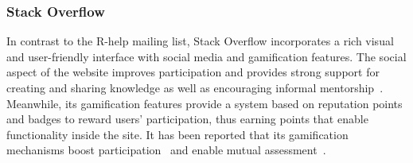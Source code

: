 \subsubsection{Stack Overflow}
\label{subsec:Rtag}

    In contrast to the R-help mailing list, Stack Overflow incorporates a rich visual and user-friendly interface with social media and gamification features.
    The social aspect of the website improves participation and provides strong support for creating and sharing knowledge as well as encouraging informal mentorship~\cite{Jenkins2009, Storey2014}.
    Meanwhile, its gamification features provide a system based on reputation points and badges to reward users' participation, thus earning points that enable functionality inside the site.
    It has been reported that its gamification mechanisms boost participation~\cite{Vasilescu2014} and enable mutual assessment~\cite{Singer2013}.


